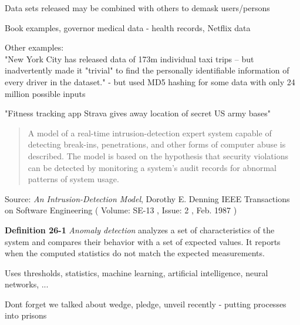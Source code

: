 \documentclass[Screen16to9,17pt]{foils}
\begin{document}

\begin{list1}
\item Data sets released may be combined with others to demask users/persons
\item Book examples, governor medical data - health records, Netflix data
\item Other examples:\\
"New York City has released data of 173m individual taxi trips – but inadvertently made it "trivial" to find the personally identifiable information of every driver in the dataset." - but used MD5 hashing for some data with only 24 million possible inputs\\
{\footnotesize{}}
\item "Fitness tracking app Strava gives away location of secret US army bases"\\
{\footnotesize{}}
\end{list1}




\begin{quote}
A model of a real-time intrusion-detection expert system capable of detecting break-ins, penetrations, and other forms of computer abuse is described. The model is based on the hypothesis that security violations can be detected by monitoring a system's audit records for abnormal patterns of system usage.
\end{quote}
Source: \emph{An Intrusion-Detection Model}, Dorothy E. Denning
IEEE Transactions on Software Engineering ( Volume: SE-13 , Issue: 2 , Feb. 1987 )

\begin{list1}
\item {\bf Definition 26-1} \emph{Anomaly detection} analyzes a set of characteristics of the system and compares their behavior with a set of expected values. It reports when the computed statistics do not match the expected measurements.
\item Uses thresholds, statistics, machine learning, artificial intelligence, neural networks, ...
\item Dont forget we talked about wedge, pledge, unveil recently - putting processes into prisons
\end{list1}
\end{document}
